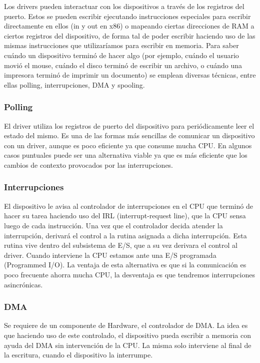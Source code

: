 \documentclass{article}
\begin{document}
Los drivers pueden interactuar con los dispositivos a través de los registros del puerto. Estos se pueden escribir ejecutando instrucciones especiales para escribir directamente en ellos (in y out en x86) o mapeando ciertas direcciones de RAM a ciertos registros del dispositivo, de forma tal de poder escribir haciendo uso de las mismas instrucciones que utilizaríamos para escribir en memoria. Para saber cu\'ando un dispositivo terminó de hacer algo (por ejemplo, cu\'ando el usuario movi\'o el mouse, cu\'ando el disco termin\'o de escribir un archivo, o cu\'ando una impresora termin\'o de imprimir un documento) se emplean diversas técnicas, entre ellas polling, interrupciones, DMA y spooling.

\subsubsection{Polling}

El driver utiliza los registros de puerto del dispositivo para peri\'odicamente leer el estado del mismo. Es una de las formas m\'as sencillas de comunicar un dispositivo con un driver, aunque es poco eficiente ya que consume mucha CPU. En algunos casos puntuales puede ser una alternativa viable ya que es m\'as eficiente que los cambios de contexto provocados por las interrupciones.

\subsubsection{Interrupciones}

El dispositivo le avisa al controlador de interrupciones en el CPU que termin\'o de hacer su tarea haciendo uso del IRL (interrupt-request line), que la CPU sensa luego de cada instrucción. Una vez que el controlador decida atender la interrupci\'on, derivará el control a la rutina asignada a dicha interrupción. Esta rutina vive dentro del subsistema de E/S, que a su vez derivara el control al driver. Cuando interviene la CPU estamos ante una E/S programada (Programmed I/O). La ventaja de esta alternativa es que si la comunicación es poco frecuente ahorra mucha CPU, la desventaja es que tendremos interrupciones asincrónicas.

\subsubsection{DMA}

Se requiere de un componente de Hardware, el controlador de DMA. La idea es que haciendo uso de este controlado, el dispositivo pueda escribir a memoria con ayuda del DMA sin intervención de la CPU. La misma solo interviene al final de la escritura, cuando el dispositivo la interrumpe.
\end{document}
